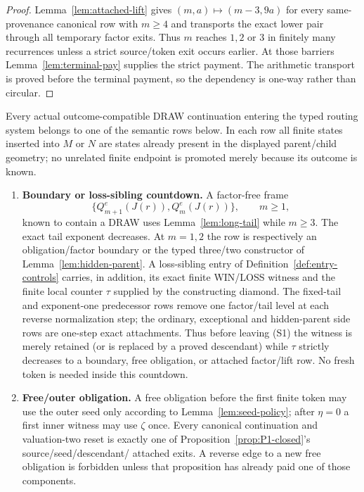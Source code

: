 \begin{proof}
Lemma~\ref{lem:attached-lift} gives
$(m,a)\mapsto(m-3,9a)$ for every same-provenance canonical row with
$m\ge4$ and transports the exact lower pair through all temporary factor
exits. Thus $m$ reaches $1,2$ or $3$ in finitely many recurrences unless a
strict source/token exit occurs earlier. At those barriers
Lemma~\ref{lem:terminal-pay} supplies the strict payment. The arithmetic
transport is proved before the terminal payment, so the dependency is
one-way rather than circular.
\end{proof}

\begin{proposition}
\label{prop:P2-closed}
Every actual outcome-compatible DRAW continuation entering the typed routing
system belongs to one of the semantic rows below.  In each row all finite
states inserted into $M$ or $N$ are states already present in the displayed
parent/child geometry; no unrelated finite endpoint is promoted merely because
its outcome is known.

\begin{enumerate}[label=\textnormal{(S\arabic*)},leftmargin=*]
\item \textbf{Boundary or loss-sibling countdown.}  A factor-free frame
\[
 \{Q_{m+1}^e(J(r)),Q_m^e(J(r))\},\qquad m\ge1,
\]
known to contain a DRAW uses Lemma~\ref{lem:long-tail} while $m\ge3$.
The exact tail exponent decreases.  At $m=1,2$ the row is respectively an
obligation/factor boundary or the typed three/two constructor of
Lemma~\ref{lem:hidden-parent}.  A loss-sibling entry of
Definition~\ref{def:entry-controls} carries, in addition, its exact finite
WIN/LOSS witness and the finite local counter $\tau$ supplied by the
constructing diamond.  The fixed-tail and exponent-one predecessor rows
remove one factor/tail level at each reverse normalization step; the
ordinary, exceptional and hidden-parent side rows are one-step exact
attachments.  Thus before leaving (S1) the witness is merely retained (or is
replaced by a proved descendant) while $\tau$ strictly decreases to a
boundary, free obligation, or attached factor/lift row.  No fresh token is
needed inside this countdown.

\item \textbf{Free/outer obligation.}  A free obligation before the first
finite token may use the outer seed only according to
Lemma~\ref{lem:seed-policy}; after $\eta=0$ a first inner witness may use
$\zeta$ once.  Every canonical continuation and valuation-two reset is
exactly one of Proposition~\ref{prop:P1-closed}'s source/seed/descendant/
attached exits.  A reverse edge to a new free obligation is forbidden unless
that proposition has already paid one of those components.


\end{enumerate}
\end{proposition}
